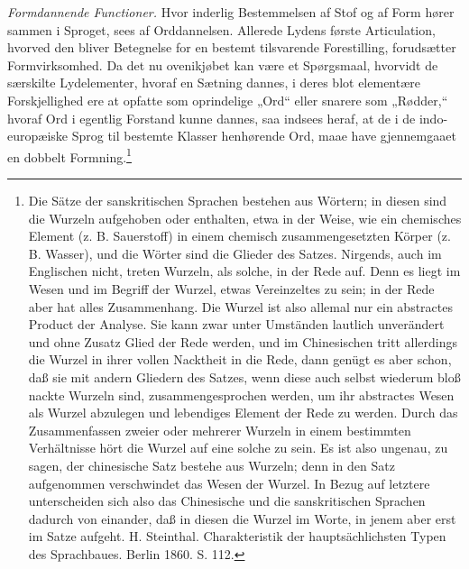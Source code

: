\documentclass[12pt]{book}
\newcommand{\opage}[1]{\marginnote{\footnotesize\textit{[#1]}}}
\begin{document}
\opage{35}\emph{Formdannende Functioner.} Hvor inderlig
Bestemmelsen af Stof og af Form hører sammen i Sproget, sees
af Orddannelsen. Allerede Lydens første Articulation,
hvorved den bliver Betegnelse for en bestemt tilsvarende
Forestilling, forudsætter Formvirksomhed. Da det nu ovenikjøbet
kan være et Spørgsmaal, hvorvidt de særskilte Lydelementer,
hvoraf en Sætning dannes, i deres blot elementære
Forskjellighed ere at opfatte som oprindelige „Ord“ eller snarere som
„Rødder,“ hvoraf Ord i egentlig Forstand kunne dannes, saa
indsees heraf, at de i de indo-europæiske Sprog til bestemte
Klasser henhørende Ord, maae have gjennemgaaet en dobbelt
Formning.\footnote{%
Die Sätze der sanskritischen Sprachen bestehen aus Wörtern; in
diesen sind die Wurzeln aufgehoben oder enthalten, etwa in der
Weise, wie ein chemisches Element (z. B. Sauerstoff) in einem
chemisch zusammengesetzten Körper (z. B. Wasser), und die Wörter
sind die Glieder des Satzes. Nirgends, auch im Englischen nicht,
treten Wurzeln, als solche, in der Rede auf. Denn es liegt im
Wesen und im Begriff der Wurzel, etwas Vereinzeltes zu sein; in
der Rede aber hat alles Zusammenhang. Die Wurzel ist also
allemal nur ein abstractes Product der Analyse. Sie kann zwar
unter Umständen lautlich unverändert und ohne Zusatz Glied der
Rede werden, und im Chinesischen tritt allerdings die Wurzel in
ihrer vollen Nacktheit in die Rede, dann genügt es aber schon, daß
sie mit andern Gliedern des Satzes, wenn diese auch selbst wiederum
bloß nackte Wurzeln sind, zusammengesprochen werden, um ihr
abstractes Wesen als Wurzel abzulegen und lebendiges Element
der Rede zu werden. Durch das Zusammenfassen zweier oder
mehrerer Wurzeln in einem bestimmten Verhältnisse hört die Wurzel
auf eine solche zu sein. Es ist also ungenau, zu sagen, der
chinesische Satz bestehe aus Wurzeln; denn in den Satz aufgenommen
verschwindet das Wesen der Wurzel. In Bezug auf letztere
unterscheiden sich also das Chinesische und die sanskritischen Sprachen
dadurch von einander, daß in diesen die Wurzel im Worte, in
jenem aber erst im Satze aufgeht. H. Steinthal. Charakteristik
der hauptsächlichsten Typen des Sprachbaues. Berlin 1860. S. 112.}
\end{document}
